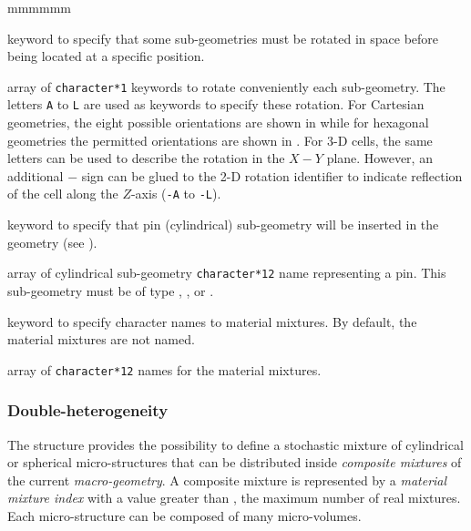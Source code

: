 \begin{ListeDeDescription}{mmmmmm}
\item[\moc{TURN}] keyword to specify that some sub-geometries must be rotated
in space before being located at a specific position.

\item[\dusa{HTURN}] array of  {\tt character*1} keywords to rotate
conveniently each sub-geometry. The letters {\tt A} to {\tt L} are used as
keywords to specify these rotation. For Cartesian geometries, the eight possible
orientations are shown in  while for hexagonal geometries
the permitted orientations are shown in . For 3-D cells, the
same letters can be used to describe the rotation in the $X-Y$ plane. However,
an additional $-$ sign can be glued to the 2-D rotation identifier to
indicate reflection of the cell along the $Z$-axis ({\tt -A} to {\tt -L}).

\item[\moc{CLUSTER}] keyword to specify that pin (cylindrical) sub-geometry
will be inserted in the geometry (see ). 

\item[\dusa{NAMPIN}] array of cylindrical sub-geometry {\tt character*12} name 
representing a pin. This sub-geometry must be of type , ,
 or .

\item[\moc{MIX-NAMES}] keyword to specify character names to material mixtures.
By default, the material mixtures are not named.

\item[\dusa{NAMMIX}] array of {\tt character*12} names for the material
mixtures.

\end{ListeDeDescription}

\clearpage

\subsubsection{Double-heterogeneity}\label{sect:descDH}

The structure  provides the possibility to define a stochastic mixture of cylindrical or spherical micro-structures that can be distributed inside {\sl composite mixtures} of the current {\sl macro-geometry}. A composite mixture is represented by a {\sl material mixture index} with a value greater than , the maximum number of real mixtures. Each micro-structure can be composed of many micro-volumes.\cite{BIHET}

